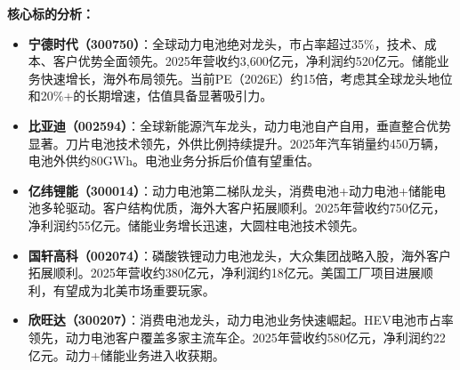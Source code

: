 \begin{exhibitbox}[图 6-4：动力电池产业链图谱与核心标的]
\vspace{0.2cm}
\end{exhibitbox}

\textbf{核心标的分析：}

\begin{itemize}[leftmargin=2em]
\item \textbf{宁德时代（300750）}：全球动力电池绝对龙头，市占率超过35\%，技术、成本、客户优势全面领先。2025年营收约3,600亿元，净利润约520亿元。储能业务快速增长，海外布局领先。当前PE（2026E）约15倍，考虑其全球龙头地位和20\%+的长期增速，估值具备显著吸引力。

\item \textbf{比亚迪（002594）}：全球新能源汽车龙头，动力电池自产自用，垂直整合优势显著。刀片电池技术领先，外供比例持续提升。2025年汽车销量约450万辆，电池外供约80GWh。电池业务分拆后价值有望重估。

\item \textbf{亿纬锂能（300014）}：动力电池第二梯队龙头，消费电池+动力电池+储能电池多轮驱动。客户结构优质，海外大客户拓展顺利。2025年营收约750亿元，净利润约55亿元。储能业务增长迅速，大圆柱电池技术领先。

\item \textbf{国轩高科（002074）}：磷酸铁锂动力电池龙头，大众集团战略入股，海外客户拓展顺利。2025年营收约380亿元，净利润约18亿元。美国工厂项目进展顺利，有望成为北美市场重要玩家。

\item \textbf{欣旺达（300207）}：消费电池龙头，动力电池业务快速崛起。HEV电池市占率领先，动力电池客户覆盖多家主流车企。2025年营收约580亿元，净利润约22亿元。动力+储能业务进入收获期。
\end{itemize}

